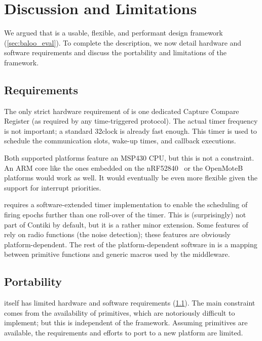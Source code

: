 \vspace{-1cm}
\section{Discussion and Limitations}
\label{sec:requirements}

We argued that \baloo is a usable, flexible, and performant design framework (\cref{sec:baloo_eval}).
To complete the description, we now detail hardware and software requirements and discuss the portability and limitations of the framework.

\subsection{Requirements}
\label{subsec:requirements}
The only strict hardware requirement of \baloo is one dedicated Capture Compare Register (as required by any time-triggered protocol). The actual timer frequency is not important; a standard 32\kHz clock is already fast enough.
This timer is used to schedule the communication slots, wake-up times, and callback executions.

Both supported platforms feature an MSP430 CPU, but this is not a constraint. An ARM core like the ones embedded on the nRF52840~\cite{nRF52840} or the OpenMoteB~\cite{OpenMoteB} platforms would work as well. It would eventually be even more flexible given the support for interrupt priorities.

\baloo requires a software-extended timer implementation to enable the scheduling of firing epochs further than one roll-over of the timer. This is (surprisingly) not part of Contiki by default, but it is a rather minor extension.
%
Some features of \baloo rely on radio functions (\eg the noise detection); these features are obviously platform-dependent.
%
The rest of the platform-dependent software in \baloo is a mapping between \ST primitive functions and generic macros used by the middleware.

\subsection{Portability}
\baloo itself has limited hardware and software requirements (\cref{subsec:requirements}). The main constraint comes from the availability of \ST primitives, which are notoriously difficult to implement; but this is independent of the framework.
Assuming \ST primitives are available, the requirements and efforts to port \baloo to a new platform are limited.

